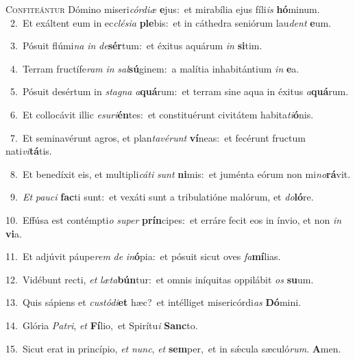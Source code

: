 \lettrine{\initial\textcolor{\initialcolor}{C}}{onfiteántur} Dómino miseri\-\textit{cór}\-\textit{di}\textit{æ} \textbf{e}\-jus:~\star et mirabília ejus fíli\textit{is} \textbf{hó}\-minum.\\
{\numbfont\textcolor{\numbcolor}{~2.}}~Et exáltent eum in ec\-\textit{clé}\-\textit{si}\textit{a} \textbf{ple}\-bis:~\star et in cáthedra seniórum lau\textit{dent} \textbf{e}\-um.\par
{\numbfont\textcolor{\numbcolor}{~3.}}~Pósuit flúmi\textit{na} \textit{in} \textit{de}\-\textbf{sér}tum:~\star et éxitus aquárum \textit{in} \textbf{si}\-tim.\par
{\numbfont\textcolor{\numbcolor}{~4.}}~Terram fructífe\textit{ram} \textit{in} \textit{sal}\-\textbf{sú}ginem:~\star a malítia inhabitántium \textit{in} \textbf{e}\-a.\par
{\numbfont\textcolor{\numbcolor}{~5.}}~Pósuit desértum in \textit{sta}\-\textit{gna} \textit{a}\-\textbf{quá}rum:~\star et terram sine aqua in éxitus \textit{a}\-\textbf{quá}rum.\par
{\numbfont\textcolor{\numbcolor}{~6.}}~Et collocávit illic \textit{e}\-\textit{su}\textit{ri}\textbf{én}tes:~\star et constituérunt civitátem habita\-\textit{ti}\-\textbf{ó}nis.\par
{\numbfont\textcolor{\numbcolor}{~7.}}~Et seminavérunt agros, et plan\-\textit{ta}\-\textit{vé}\textit{runt} \textbf{ví}\-neas:~\star et fecérunt fructum nati\-\textit{vi}\-\textbf{tá}tis.\par
{\numbfont\textcolor{\numbcolor}{~8.}}~Et benedíxit eis, et multipli\-\textit{cá}\-\textit{ti} \textit{sunt} \textbf{ni}\-mis:~\star et juménta eórum non mi\-\textit{no}\-\textbf{rá}vit.\par
{\numbfont\textcolor{\numbcolor}{~9.}}~\textit{Et} \textit{pau}\-\textit{ci} \textbf{fac}\-ti sunt:~\star et vexáti sunt a tribulatióne malórum, et \textit{do}\-\textbf{ló}re.\par
{\numbfont\textcolor{\numbcolor}{10.}}~Effúsa est contémpti\textit{o} \textit{su}\-\textit{per} \textbf{prín}\-cipes:~\star et erráre fecit eos in ínvio, et non \textit{in} \textbf{vi}\-a.\par
{\numbfont\textcolor{\numbcolor}{11.}}~Et adjúvit páupe\textit{rem} \textit{de} \textit{in}\-\textbf{ó}pia:~\star et pósuit sicut oves \textit{fa}\-\textbf{mí}lias.\par
{\numbfont\textcolor{\numbcolor}{12.}}~Vidébunt recti, \textit{et} \textit{læ}\-\textit{ta}\textbf{bún}tur:~\star et omnis iníquitas oppilábit \textit{os} \textbf{su}\-um.\par
{\numbfont\textcolor{\numbcolor}{13.}}~Quis sápiens et \textit{cus}\-\textit{tó}\textit{di}\textbf{et} hæc?~\star et intélliget misericórdi\textit{as} \textbf{Dó}\-mini.\par
{\numbfont\textcolor{\numbcolor}{14.}}~Glória \textit{Pa}\-\textit{tri}, \textit{et} \textbf{Fí}\-lio,~\star et Spirítu\textit{i} \textbf{Sanc}\-to.\par
{\numbfont\textcolor{\numbcolor}{15.}}~Sicut erat in princípio, \textit{et} \textit{nunc}\-, \textit{et} \textbf{sem}\-per,~\star et in sǽcula sæculó\-\textit{rum}\-. \textbf{A}\-men.\par
